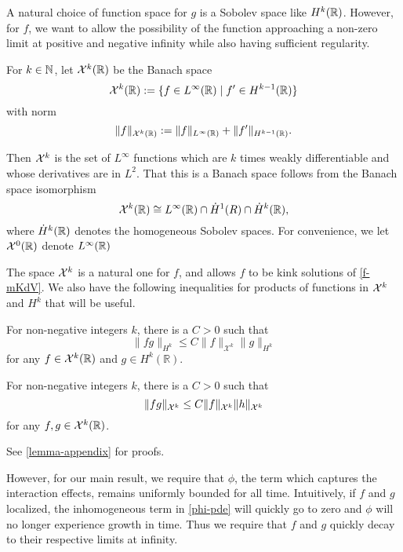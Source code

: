A natural choice of function space for \(g\) is a Sobolev space like \(H^k(\mathbb{R})\). However, for \(f\), we want to allow the possibility of the function approaching a non-zero limit at positive and negative infinity while also having sufficient regularity. 
\begin{defn}
	For \(k\in\mathbb{N}\), let \(\mathcal{X}^k(\mathbb{R})\) be the Banach space 
	\begin{equation}
		\mathcal{X}^k(\mathbb{R}) := \{f \in L^\infty(\mathbb{R}) \mid f'\in H^{k-1}(\mathbb{R})\}
	\end{equation}
	with norm
	\begin{equation}
		\| f \|_{\mathcal{X}^k(\mathbb{R})} := \| f \|_{L^\infty(\mathbb{R})} + \| f' \|_{H^{k-1}(\mathbb{R})}.
	\end{equation}
\end{defn}
Then \(\mathcal{X}^k\) is the set of \(L^\infty\) functions which are \(k\) times weakly differentiable and whose derivatives are in \(L^2\). That this is a Banach space follows from the Banach space isomorphism
\begin{equation}
	\mathcal{X}^k(\mathbb{R}) \cong L^\infty(\mathbb{R}) \cap \dot H^1(R) \cap \dot H^k(\mathbb{R}),
\end{equation}
where \(\dot H^k(\mathbb{R})\) denotes the homogeneous Sobolev spaces. For convenience, we let \(\mathcal{X}^0(\mathbb{R})\) denote \(L^\infty(\mathbb{R})\)

The space \(\mathcal{X}^k\) is a natural one for \(f\), and allows \(f\) to be kink solutions of \cref{f-mKdV}. We also have the following inequalities for products of functions in \(\mathcal{X}^k\) and \(H^k\) that will be useful. 

	
\begin{lem}
	For non-negative integers \(k\), there is a \(C>0\) such that
	\begin{equation}\label{prod_rule}
		\| fg \|_{H^k} \leq C \| f \|_{\mathcal X^k} \| g \|_{H^k}
	\end{equation}
	for any \(f\in \mathcal{X}^k(\mathbb R)\) and \(g \in H^k(\mathbb R)\).
\end{lem}

\begin{lem}
	For non-negative integers \(k\), there is a \(C>0\) such that
	\begin{equation}
		\| fg \|_{\mathcal{X}^k} \leq C \| f \|_{\mathcal{X}^k} \| h \|_{\mathcal{X}^k}
	\end{equation}
	for any \(f,g\in \mathcal{X}^k(\mathbb R)\).
\end{lem}
See \cref{lemma-appendix} for proofs.

However, for our main result, we require that \(\phi\), the term which captures the interaction effects, remains uniformly bounded for all time. Intuitively, if \(f\) and \(g\) localized, the inhomogeneous term in \cref{phi-pde} will quickly go to zero and \(\phi\) will no longer experience growth in time. Thus we require that \(f\) and \(g\) quickly decay to their respective limits at infinity. 

